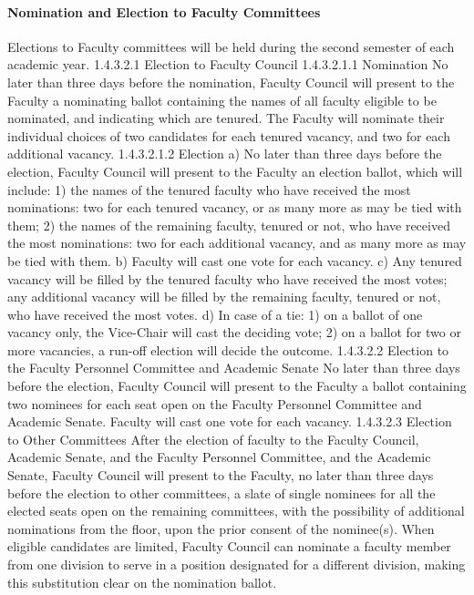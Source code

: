 \documentclass[letterpaper, 11pt]{article}
\begin{document}
			\paragraph{	Nomination and Election to Faculty Committees}
				Elections to Faculty committees will be held during the second semester of each academic year.
				1.4.3.2.1 Election to Faculty Council
				1.4.3.2.1.1 Nomination
				No later than three days before the nomination, Faculty Council will present to the Faculty a nominating ballot containing the names of all faculty eligible to be nominated, and indicating which are tenured.  The Faculty will nominate their individual choices of two candidates for each tenured vacancy, and two for each additional vacancy.
				1.4.3.2.1.2 Election
				a) No later than three days before the election, Faculty Council will present to the Faculty an election ballot, which will include:
				1) the names of the tenured faculty who have received the most nominations:  two for each tenured vacancy, or as many more as may be tied with them;
				2) the names of the remaining faculty, tenured or not, who have received the most nominations:  two for each additional vacancy, and as many more as may be tied with them.
				b) Faculty will cast one vote for each vacancy.
				c) Any tenured vacancy will be filled by the tenured faculty who have received the most votes; any additional vacancy will be filled by the remaining faculty, tenured or not, who have received the most votes.
				d) In case of a tie:
				1) on a ballot of one vacancy only, the Vice-Chair will cast the deciding vote;
				2) on a ballot for two or more vacancies, a run-off election will decide the outcome.
				1.4.3.2.2 Election to the Faculty Personnel Committee and Academic Senate
				No later than three days before the election, Faculty Council will present to the Faculty a ballot containing two nominees for each seat open on the Faculty Personnel Committee and Academic Senate.  Faculty will cast one vote for each vacancy.
				1.4.3.2.3 Election to Other Committees
				After the election of faculty to the Faculty Council, Academic Senate, and the Faculty Personnel Committee, and the Academic Senate, Faculty Council will present to the Faculty, no later than three days before the election to other committees, a slate of single nominees for all the elected seats open on the remaining committees, with the possibility of additional nominations from the floor, upon the prior consent of the nominee(s).  When eligible candidates are limited, Faculty Council can nominate a faculty member from one division to serve in a position designated for a different division, making this substitution clear on the nomination ballot.
\end{document}
